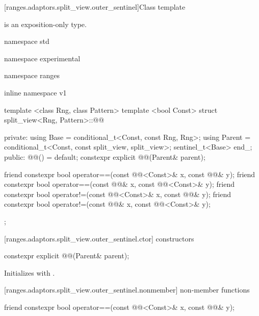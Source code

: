 [ranges.adaptors.split_view.outer_sentinel]{Class template }

\pnum
\enternote {} is an exposition-only type.\exitnote

\begin{codeblock}
namespace std { namespace experimental { namespace ranges { inline namespace v1 {
  template <class Rng, class Pattern>
  template <bool Const>
  struct split_view<Rng, Pattern>::@@ {
  private:
    using Base = conditional_t<Const, const Rng, Rng>;
    using Parent = conditional_t<Const, const split_view, split_view>;
    sentinel_t<Base> end_;
  public:
    @@() = default;
    constexpr explicit @@(Parent& parent);

    friend constexpr bool operator==(const @@<Const>& x, const @@& y);
    friend constexpr bool operator==(const @@& x, const @@<Const>& y);
    friend constexpr bool operator!=(const @@<Const>& x, const @@& y);
    friend constexpr bool operator!=(const @@& x, const @@<Const>& y);
  };
}}}}
\end{codeblock}

[ranges.adaptors.split_view.outer_sentinel.ctor]{ constructors}

%
\begin{itemdecl}
constexpr explicit @@(Parent& parent);
\end{itemdecl}

\begin{itemdescr}
\pnum
\effects Initializes  with .
\end{itemdescr}

[ranges.adaptors.split_view.outer_sentinel.nonmember]{ non-member functions}

%
\begin{itemdecl}
friend constexpr bool operator==(const @@<Const>& x, const @@& y);
\end{itemdecl}

